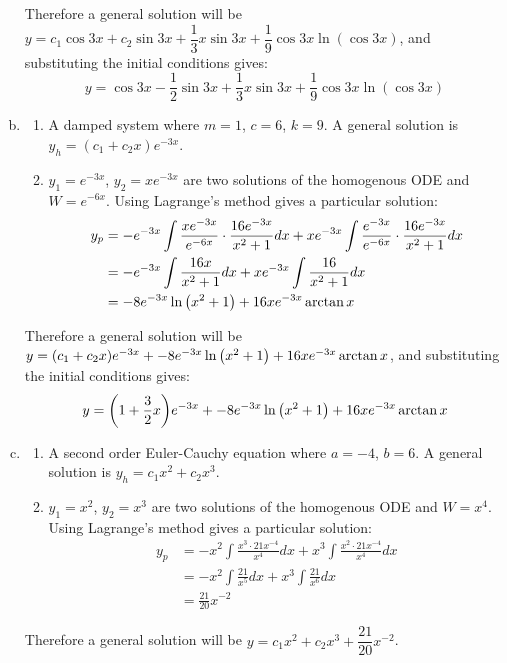 \documentclass[10pt]{article}
\begin{document}
\begin{enumerate}[(a), leftmargin=*]
\begin{enumerate}[(1), leftmargin=*]
    \end{enumerate}
    Therefore a general solution will be $y = c_1\cos{3x} + c_2\sin{3x} + \dfrac{1}{3}x\sin{3x} + \dfrac{1}{9}\cos{3x}\ln(\cos{3x})$, and substituting the initial conditions gives:
    $$y = \cos{3x} - \frac{1}{2}\sin{3x} + \frac{1}{3}x\sin{3x} + \frac{1}{9}\cos{3x}\ln(\cos{3x})$$
    \item \begin{enumerate}[(1), leftmargin=*]
        \item A damped system where $m = 1$, $c = 6$, $k = 9$. A general solution is $y_h = (c_1 + c_2x)e^{-3x}$.
        \item $y_1 = e^{-3x}$, $y_2 = xe^{-3x}$ are two solutions of the homogenous ODE and $W = e^{-6x}$. Using Lagrange's method gives a particular solution:
        \begin{align*}
            y_p &= -e^{-3x}\int{\frac{xe^{-3x}}{e^{-6x}}\cdot\frac{16e^{-3x}}{x^2+1}}dx + xe^{-3x}\int{\frac{e^{-3x}}{e^{-6x}}\cdot\frac{16e^{-3x}}{x^2+1}}dx \\
            &= -e^{-3x}\int{\frac{16x}{x^2+1}}dx + xe^{-3x}\int{\frac{16}{x^2+1}}dx \\
            &= -8e^{-3x}\ln\qty(x^2+1) + 16xe^{-3x}\arctan{x}
        \end{align*}
    \end{enumerate}
    Therefore a general solution will be $y = (c_1 + c_2x)e^{-3x} + -8e^{-3x}\ln\qty(x^2+1) + 16xe^{-3x}\arctan{x}$, and substituting the initial conditions gives:
    $$y = \qty(1 + \frac{3}{2}x)e^{-3x} + -8e^{-3x}\ln\qty(x^2+1) + 16xe^{-3x}\arctan{x}$$
    \item \begin{enumerate}[(1), leftmargin=*]
        \item A second order Euler-Cauchy equation where $a = -4$, $b = 6$. A general solution is $y_h = c_1x^2 + c_2x^3$.
        \item $y_1 = x^2$, $y_2 = x^3$ are two solutions of the homogenous ODE and $W = x^4$. Using Lagrange's method gives a particular solution:
        \begin{align*}
            y_p &= -x^2\int{\frac{x^3 \cdot 21x^{-4}}{x^4}}dx + x^3\int{\frac{x^2 \cdot 21x^{-4}}{x^4}}dx \\
            &= -x^2\int{\frac{21}{x^5}}dx + x^3\int{\frac{21}{x^6}}dx \\
            &= \frac{21}{20}x^{-2}
        \end{align*}
    \end{enumerate}
    Therefore a general solution will be $y = c_1x^2 + c_2x^3 + \dfrac{21}{20}x^{-2}$.
\end{enumerate}
\end{document}
